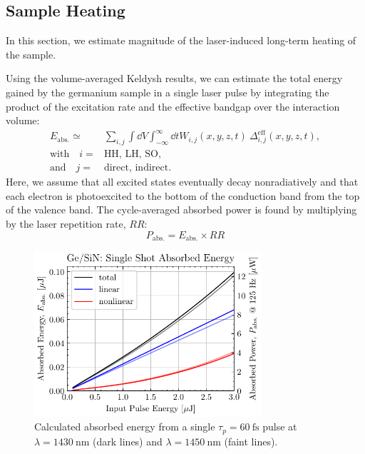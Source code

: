 \subsection{Sample Heating}

In this section, we estimate magnitude of the laser-induced long-term heating of the sample. 

Using the volume-averaged Keldysh results, we can estimate the total energy gained by the germanium sample in a single laser pulse by integrating the product of the excitation rate and the effective bandgap over the interaction volume:
\begin{equation}
\begin{split}
E_{\textrm{abs.}} \simeq {}& \sum_{i,j} \int \dd{V} \int_{-\infty}^{\infty} \dd{t} W_{i,j} (x, y, z, t) \ \Delta_{i,j}^{\textrm{eff}}(x,y,z,t), \\
\textrm{with} \quad i={}&\textrm{HH, LH, SO}, \\
\textrm{and} \quad j={}&\textrm{direct, indirect.}
\end{split}
\label{eqn:absorbed_energy}
\end{equation}
Here, we assume that all excited states eventually decay nonradiatively and that each electron is photoexcited to the bottom of the conduction band from the top of the valence band. The cycle-averaged absorbed power is found by multiplying by the laser repetition rate, $RR$:
\begin{equation}
P_{\textrm{abs.}} = E_{\textrm{abs.}} \times RR
\label{eqn:absorbed_power}
\end{equation}

\begin{figure}
	\centering
	\includegraphics[width=0.75\textwidth]{figures/chap4/Single_shot_abs_ener.pdf}
	\caption{Calculated absorbed energy from a single $\tau_p = 60 \ \textrm{fs}$ pulse at $\lambda=1430 \ \textrm{nm}$ (dark lines) and $\lambda = 1450 \ \textrm{nm}$ (faint lines).}
	\label{fig:Single_shot_abs_ener}
\end{figure}

